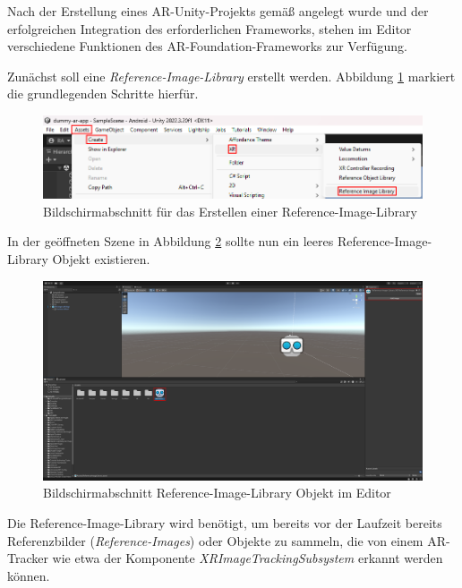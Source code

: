 Nach der Erstellung eines AR-Unity-Projekts gemäß \autocite{Unity2024:ProjectSetup} angelegt wurde und der erfolgreichen Integration des erforderlichen Frameworks, stehen im Editor verschiedene Funktionen des AR-Foundation-Frameworks zur Verfügung.

Zunächst soll eine \textit{Reference-Image-Library} erstellt werden. Abbildung \ref{fig:implementierung:unity:AR-Create-Img-Lib} markiert die grundlegenden Schritte hierfür.

\begin{figure}[H]
    \centering
    \includegraphics[width=\textwidth]{images/PrAr_UnityAR-Create-Img-Lib.png}
    \caption{Bildschirmabschnitt für das Erstellen einer Reference-Image-Library}
    \label{fig:implementierung:unity:AR-Create-Img-Lib}
\end{figure}

In der geöffneten Szene in Abbildung \ref{fig:implementierung:unity:AR-See-Img-Lib} sollte nun ein leeres Reference-Image-Library Objekt existieren.

\begin{figure}[H]
    \centering
    \includegraphics[width=\textwidth]{images/PrAr_UnityAR-See-Img-lib.png}
    \caption{Bildschirmabschnitt Reference-Image-Library Objekt im Editor}
    \label{fig:implementierung:unity:AR-See-Img-Lib}
\end{figure}

Die Reference-Image-Library wird benötigt, um bereits vor der Laufzeit bereits Referenzbilder (\textit{Reference-Images}) oder Objekte zu sammeln, die von einem AR-Tracker wie etwa der Komponente \textit{XRImageTrackingSubsystem} erkannt werden können.

